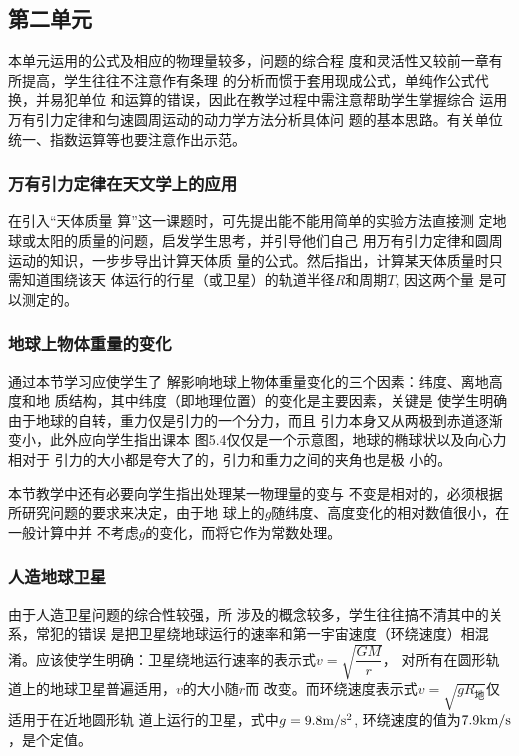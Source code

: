\subsection{第二单元}
本单元运用的公式及相应的物理量较多，问题的综合程
度和灵活性又较前一章有所提高，学生往往不注意作有条理
的分析而惯于套用现成公式，单纯作公式代换，并易犯单位
和运算的错误，因此在教学过程中需注意帮助学生掌握综合
运用万有引力定律和匀速圆周运动的动力学方法分析具体问
题的基本思路。有关单位统一、指数运算等也要注意作出示范。

\subsubsection{万有引力定律在天文学上的应用} 

在引入“天体质量
算”这一课题时，可先提出能不能用简单的实验方法直接测
定地球或太阳的质量的问题，启发学生思考，并引导他们自己
用万有引力定律和圆周运动的知识，一步步导出计算天体质
量的公式。然后指出，计算某天体质量时只需知道围绕该天
体运行的行星（或卫星）的轨道半径$R$和周期$T$, 因这两个量
是可以测定的。

\subsubsection{地球上物体重量的变化}

通过本节学习应使学生了
解影响地球上物体重量变化的三个因素：纬度、离地高度和地
质结构，其中纬度（即地理位置）的变化是主要因素，关键是
使学生明确由于地球的自转，重力仅是引力的一个分力，而且
引力本身又从两极到赤道逐渐变小，此外应向学生指出课本
图5.4仅仅是一个示意图，地球的椭球状以及向心力相对于
引力的大小都是夸大了的，引力和重力之间的夹角也是极
小的。

本节教学中还有必要向学生指出处理某一物理量的变与
不变是相对的，必须根据所研究问题的要求来决定，由于地
球上的$g$随纬度、高度变化的相对数值很小，在一般计算中并
不考虑$g$的变化，而将它作为常数处理。


\subsubsection{人造地球卫星}

由于人造卫星问题的综合性较强，所
涉及的概念较多，学生往往搞不清其中的关系，常犯的错误
是把卫星绕地球运行的速率和第一宇宙速度（环绕速度）相混
淆。应该使学生明确：卫星绕地运行速率的表示式$v=\sqrt{\dfrac{GM}{r}}$，
对所有在圆形轨道上的地球卫星普遍适用，$v$的大小随$r$而
改变。而环绕速度表示式$v=\sqrt{gR_{\text{地}}}$仅适用于在近地圆形轨
道上运行的卫星，式中$g=9.8\text{m}/\text{s}^2$, 环绕速度的值为$7.9{\rm km/s}$，是个定值。

